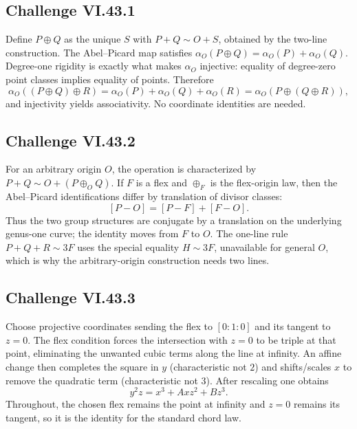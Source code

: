 \subsection*{Challenge VI.43.1}
\begin{solution}
Define \(P\oplus Q\) as the unique \(S\) with \(P+Q\sim O+S\), obtained by the two-line construction.  The Abel--Picard map satisfies \(\alpha_O(P\oplus Q)=\alpha_O(P)+\alpha_O(Q)\).  Degree-one rigidity is exactly what makes \(\alpha_O\) injective: equality of degree-zero point classes implies equality of points.  Therefore
\[
\alpha_O((P\oplus Q)\oplus R)=\alpha_O(P)+\alpha_O(Q)+\alpha_O(R)=\alpha_O(P\oplus(Q\oplus R)),
\]
and injectivity yields associativity.  No coordinate identities are needed.
\end{solution}

\subsection*{Challenge VI.43.2}
\begin{solution}
For an arbitrary origin \(O\), the operation is characterized by \(P+Q\sim O+(P\oplus_O Q)\).  If \(F\) is a flex and \(\oplus_F\) is the flex-origin law, then the Abel--Picard identifications differ by translation of divisor classes:
\[
[P-O]=[P-F]+[F-O].
\]
Thus the two group structures are conjugate by a translation on the underlying genus-one curve; the identity moves from \(F\) to \(O\).  The one-line rule \(P+Q+R\sim3F\) uses the special equality \(H\sim3F\), unavailable for general \(O\), which is why the arbitrary-origin construction needs two lines.
\end{solution}

\subsection*{Challenge VI.43.3}
\begin{solution}
Choose projective coordinates sending the flex to \([0:1:0]\) and its tangent to \(z=0\).  The flex condition forces the intersection with \(z=0\) to be triple at that point, eliminating the unwanted cubic terms along the line at infinity.  An affine change then completes the square in \(y\) (characteristic not \(2\)) and shifts/scales \(x\) to remove the quadratic term (characteristic not \(3\)).  After rescaling one obtains
\[
y^2z=x^3+Axz^2+Bz^3.
\]
Throughout, the chosen flex remains the point at infinity and \(z=0\) remains its tangent, so it is the identity for the standard chord law.
\end{solution}

